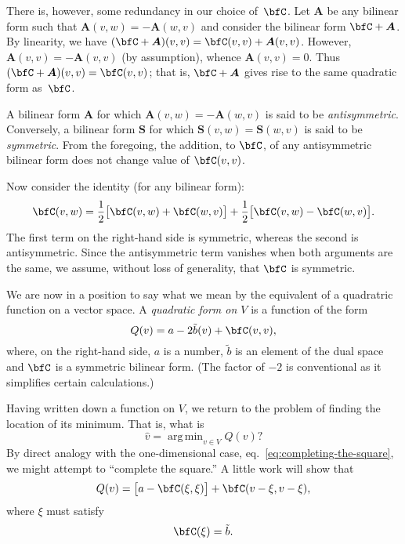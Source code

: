 \documentclass[10pt, a4paper]{article}
\DeclareMathOperator*{\argmin}{arg\,min}
\begin{document}
There is, however, some redundancy in our choice of~$\bfC$. Let
$\bm{A}$ be any bilinear form such that $\bm{A}(v,w)=-\bm{A}(w,v)$ and
consider the bilinear form $\bfC+\bm{A}$. By linearity, we have
$(\bfC+\bm{A})(v, v) = \bfC(v,v)+\bm{A}(v,v)$. However,
$\bm{A}(v,v)=-\bm{A}(v,v)$ (by assumption), whence
$\bm{A}(v,v)=0$. Thus $(\bfC+\bm{A})(v,v)=\bfC(v,v)$; that is,
$\bfC+\bm{A}$ gives rise to the same quadratic form as~$\bfC$.

A bilinear form $\bm{A}$ for which $\bm{A}(v,w)=-\bm{A}(w,v)$ is said
to be \emph{antisymmetric}. Conversely, a bilinear form $\bm{S}$ for
which $\bm{S}(v,w)=\bm{S}(w,v)$ is said to be \emph{symmetric}. From
the foregoing, the addition, to $\bfC$, of any antisymmetric bilinear
form does not change value of $\bfC(v,v)$.

Now consider the identity (for any bilinear form):
\[
  \bfC(v, w) = \frac{1}{2}\bigl[\bfC(v,w) + \bfC(w,v)\bigr]
  + \frac{1}{2}\bigl[\bfC(v,w) - \bfC(w,v)\bigr].
\]
The first term on the right-hand side is symmetric, whereas the second
is antisymmetric. Since the antisymmetric term vanishes when both
arguments are the same, we assume, without loss of generality, that
$\bfC$ is symmetric.

We are now in a position to say what we mean by the equivalent of a
quadratric function on a vector space. A \emph{quadratic form on $V$}
is a function of the form 
\begin{equation}
  Q(v) = a - 2\tilde{b}(v) + \bfC(v, v),
  \label{eq:quadratic-function}
\end{equation}
where, on the right-hand side, $a$ is a number, $\tilde{b}$ is an
element of the dual space and $\bfC$ is a symmetric bilinear
form. (The factor of $-2$ is conventional as it simplifies certain
calculations.)

Having written down a function on $V$, we return to the problem of
finding the location of its minimum. That is, what is
\[
\hat{v} = \argmin_{v\in V} Q(v)?
\]
By direct analogy with the one-dimensional case,
eq.~\eqref{eq:completing-the-square}, we might attempt to “complete
the square.” A little work will show that
\begin{equation}
  Q(v) = \bigl[a-\bfC(\xi,\xi)\bigr] + \bfC(v-\xi,v-\xi),
  \label{eq:vector-square}
\end{equation}
where $\xi$ must satisfy
\begin{equation}
  \label{eq:minimiser}
  \bfC(\xi) = \tilde{b}.
\end{equation}
\end{document}
